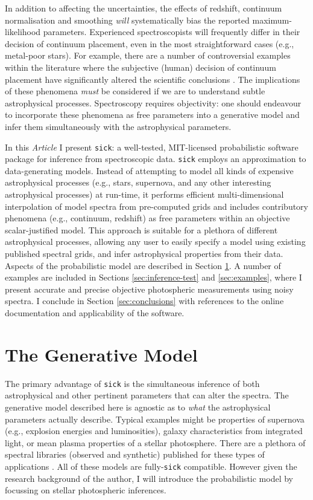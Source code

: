 \documentclass[iop]{emulateapj}
\newcommand{\sick}{\texttt{sick}}
\newcommand{\article}{\textit{Article}}
\begin{document}
In addition to affecting the uncertainties, the effects of redshift, continuum 
normalisation and smoothing \textit{will} systematically bias the reported 
maximum-likelihood parameters. Experienced spectroscopists will frequently 
differ in their decision of continuum placement, even in the most 
straightforward cases (e.g., metal-poor stars). For example, there are a number 
of controversial examples within the literature where the subjective (human) 
decision of continuum placement have significantly altered the scientific 
conclusions \citep[e.g., see][where this issue is discussed in great 
detail]{kerzendorf}. The implications of these phenomena \textit{must} be 
considered if we are to understand subtle astrophysical processes. Spectroscopy 
requires objectivity: one should endeavour to incorporate these phenomena as 
free parameters into a generative model and infer them simultaneously with the 
astrophysical parameters.

In this \article{} I present \sick{}: a well-tested, MIT-licensed probabilistic 
software package for inference from spectroscopic data. \sick{} employs an 
approximation to data-generating models. Instead of attempting to model all 
kinds of expensive astrophysical processes (e.g., stars, supernova, 
and any other interesting astrophysical processes) at run-time, it performs 
efficient multi-dimensional interpolation of model spectra from pre-computed 
grids and includes contributory phenomena (e.g., continuum, redshift) as free
parameters within an objective scalar-justified model. This approach is suitable 
for a plethora of different astrophysical 
processes, allowing any user to easily specify a model using existing published 
spectral grids, and infer astrophysical properties from their data. Aspects of 
the probabilistic model are described in Section \ref{sec:model}. A number of 
examples are included in Sections \ref{sec:inference-test} and \ref{sec:examples}, 
where I present accurate and precise objective photospheric measurements using 
noisy spectra. I conclude in Section \ref{sec:conclusions} with references to 
the online documentation and applicability of the software.

\section{The Generative Model}
\label{sec:model}

The primary advantage of \sick{} is the simultaneous inference of both 
astrophysical and other pertinent parameters that can alter the spectra. The 
generative model described here is agnostic as to \textit{what} the 
astrophysical parameters actually describe. Typical examples might be properties 
of supernova (e.g., explosion energies and luminosities), galaxy characteristics 
from integrated light, or mean plasma properties of a stellar photosphere. There 
are a plethora of spectral libraries (observed and synthetic) published for these 
types of applications \citep[e.g.,][]{snid,pegase,phoenix,pollux}. All of these 
models are fully-\sick{} compatible. However given the research background of 
the author, I will introduce the probabilistic model by focussing on stellar 
photospheric inferences.
\end{document}
